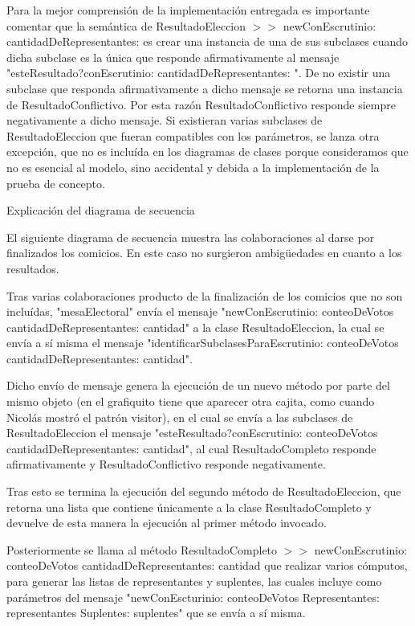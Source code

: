 Para la mejor comprensión de la implementación entregada es importante comentar que la semántica de ResultadoEleccion $>>$ newConEscrutinio: cantidadDeRepresentantes:  es crear una instancia de una de sus subclases cuando dicha subclase es la única que responde afirmativamente al mensaje "esteResultado?conEscrutinio: cantidadDeRepresentantes: ". De no existir una subclase que responda afirmativamente a dicho mensaje se retorna una instancia de ResultadoConflictivo. Por esta razón ResultadoConflictivo responde siempre negativamente a dicho mensaje. Si existieran varias subclases de ResultadoEleccion que fueran compatibles con los parámetros, se lanza otra excepción, que no es incluída en los diagramas de clases porque consideramos que no es esencial al modelo, sino accidental y debida a la implementación de la prueba de concepto.



Explicación del diagrama de secuencia




El siguiente diagrama de secuencia muestra las colaboraciones al darse por finalizados los comicios. En este caso no surgieron ambigüedades en cuanto a los resultados. 


Tras varias colaboraciones producto de la finalización de los comicios que no son incluídas, "mesaElectoral" envía el mensaje 
"newConEscrutinio: conteoDeVotos cantidadDeRepresentantes: cantidad" a la clase ResultadoEleccion, la cual se envía a sí misma el mensaje "identificarSubclasesParaEscrutinio: conteoDeVotos cantidadDeRepresentantes: cantidad". 

Dicho envío de mensaje genera la ejecución de un nuevo método por parte del mismo objeto (en el grafiquito tiene que aparecer otra cajita, como cuando Nicolás mostró el patrón visitor), en el cual se envía a las subclases de ResultadoEleccion el mensaje "esteResultado?conEscrutinio: conteoDeVotos cantidadDeRepresentantes: cantidad", al cual ResultadoCompleto responde afirmativamente y ResultadoConflictivo responde negativamente.

Tras esto se termina la ejecución del segundo método de ResultadoEleccion, que retorna una lista que contiene únicamente a la clase ResultadoCompleto y devuelve de esta manera la ejecución al primer método invocado.

Posteriormente se llama al método ResultadoCompleto $>>$ newConEscrutinio: conteoDeVotos cantidadDeRepresentantes: cantidad
que realizar varios cómputos, para generar las listas de representantes y suplentes, las cuales incluye como parámetros del mensaje "newConEscturinio: conteoDeVotos Representantes: representantes Suplentes: suplentes" que se envía a sí misma.

